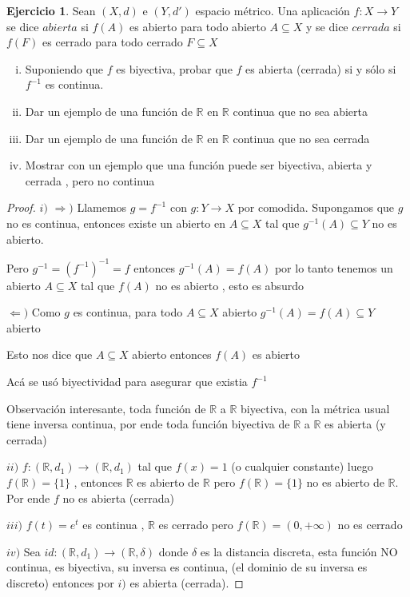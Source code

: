 \documentclass[12pt]{article}
\newcommand{\R}{\mathbb{R}}
\newcommand{\Ra}{\Rightarrow}
\newcommand{\ra}{\rightarrow}
\theoremstyle{definition}
\newtheorem{ej}{Ejercicio}
\begin{document}
 \begin{ej}
   Sean $(X,d)$ e $(Y,d')$ espacio métrico. Una aplicación $f: X \ra Y$ se dice $abierta$ si $f(A)$ es abierto para todo abierto $A \subseteq X$ y se dice $cerrada$ si $f(F)$ es cerrado para todo cerrado $F \subseteq X$
   \begin{enumerate}[i.]
     \item Suponiendo que $f$ es biyectiva, probar que $f$ es abierta (cerrada) si y sólo si $f^{-1}$ es continua.
     \item Dar un ejemplo de una función de $\R$ en $\R$ continua que no sea abierta
     \item Dar un ejemplo de una función de $\R$ en $\R$ continua que no sea cerrada
     \item Mostrar con un ejemplo que una función puede ser biyectiva, abierta y cerrada , pero no continua
   \end{enumerate}
   \begin{proof}
 $i)$ $\Ra )$ Llamemos $g = f^{-1}$ con $g: Y \ra X$ por comodida. Supongamos que $g$ no es continua, entonces existe un abierto en $A \subseteq X$ tal que $g^{-1}(A) \subseteq Y$ no es abierto. 

     Pero $g^{-1} = (f^{-1})^{-1} = f$ entonces $g^{-1}(A) = f(A) $ por lo tanto tenemos un abierto $A \subseteq X$ tal que $f(A)$ no es abierto , esto es absurdo

   $\Leftarrow )$ Como $g$ es continua, para todo $A \subseteq X$ abierto $g^{-1}(A) = f(A) \subseteq Y$ abierto

   Esto nos dice que $A \subseteq X$ abierto entonces $f(A)$ es abierto

   Acá se usó biyectividad para asegurar que existia $f^{-1}$

   Observación interesante, toda función de $\R$ a $\R$ biyectiva, con la métrica usual tiene inversa continua, por ende toda función biyectiva de $\R$ a $\R$ es abierta (y cerrada)

 $ii)$ $f: (\R,d_1) \ra (\R,d_1)$ tal que $f(x) = 1$ (o cualquier constante) luego $f(\R) = \{1\}$ , entonces $\R$ es abierto de $\R$ pero $f(\R) = \{1\}$ no es abierto de $\R$. Por ende $f$ no es abierta (cerrada)

 $iii)$ $f(t) = e^t$ es continua , $\R$ es cerrado pero $f(\R) = (0,+\infty)$ no es cerrado

 $iv)$ Sea $id: (\R,d_1) \ra (\R,\delta)$ donde $\delta$ es la distancia discreta, esta función NO continua, es biyectiva, su inversa es continua, (el dominio de su inversa es discreto) entonces por $i)$ es abierta (cerrada). 
   \end{proof}
 \end{ej}
\end{document}
